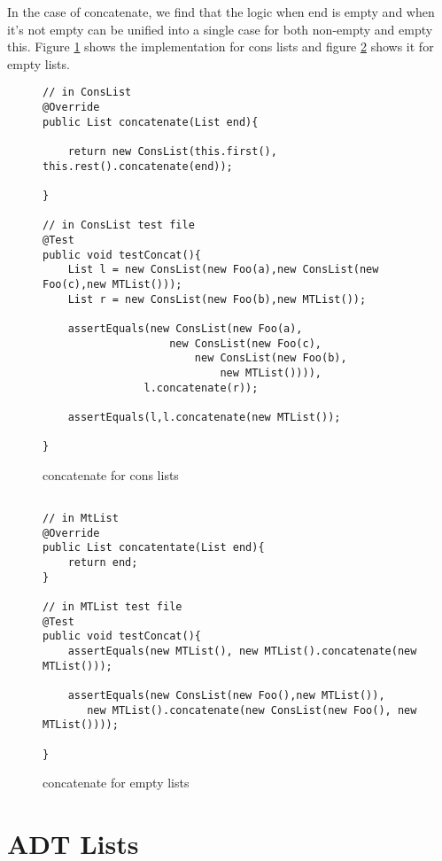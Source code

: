 \documentclass[]{tufte-handout}
\begin{document}
In the case of concatenate, we find that the logic when end is empty and when it's not empty can be unified into a single case for both non-empty and empty this. Figure \ref{fig:conscat} shows the implementation for cons lists and figure \ref{fig:mtcat} shows it for empty lists.

\begin{figure}
\begin{lstlisting}
// in ConsList
@Override
public List concatenate(List end){
	
	return new ConsList(this.first(), this.rest().concatenate(end));
	
}

// in ConsList test file
@Test
public void testConcat(){
	List l = new ConsList(new Foo(a),new ConsList(new Foo(c),new MTList()));
	List r = new ConsList(new Foo(b),new MTList());
	
	assertEquals(new ConsList(new Foo(a),
					new ConsList(new Foo(c),
						new ConsList(new Foo(b),						
							new MTList()))),
				l.concatenate(r));
	
	assertEquals(l,l.concatenate(new MTList());

}

\end{lstlisting}
\label{fig:conscat}
\caption{concatenate for cons lists}
\end{figure}

\begin{figure}
\begin{lstlisting}

// in MtList
@Override
public List concatentate(List end){
	return end;
}

// in MTList test file
@Test
public void testConcat(){
	assertEquals(new MTList(), new MTList().concatenate(new MTList()));
	
	assertEquals(new ConsList(new Foo(),new MTList()),
	   new MTList().concatenate(new ConsList(new Foo(), new MTList())));

}
\end{lstlisting}
\label{fig:mtcat}
\caption{concatenate for empty lists}
\end{figure}

\section{ADT Lists}
\end{document}
